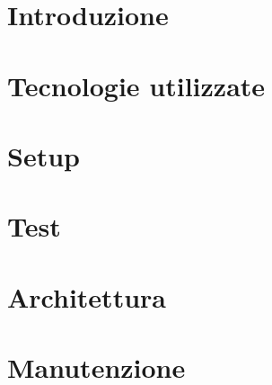 \documentclass[]{article}
\begin{document}
	
	\newpage
	\tableofcontents
	\newpage
	\listoffigures
	\listoftables
	\newpage


	\section{Introduzione}
	
	\newpage

	\section{Tecnologie utilizzate}
	
	\newpage

	\section{Setup}
	
	\newpage

	\section{Test}
	
	\newpage

	\section{Architettura}
	
	\newpage

	\section{Manutenzione}
	
	\newpage
	
	
	
\end{document}
